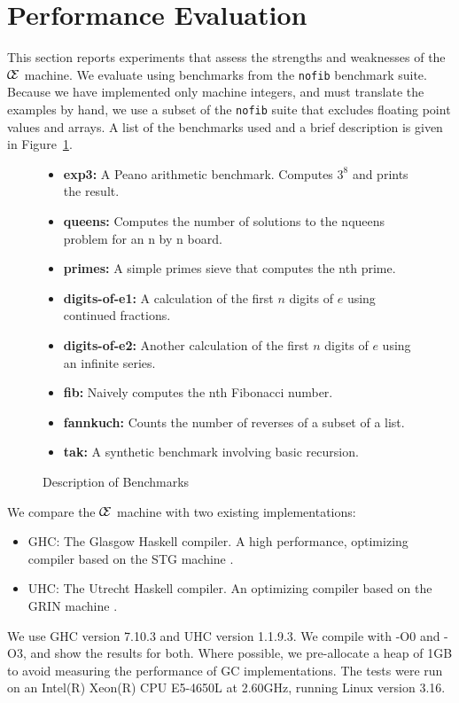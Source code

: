 \section{Performance Evaluation} \label{sec:eval}

This section reports experiments that assess the strengths and weaknesses of
the $\mathcal{\mathcal{C} \mskip -4mu \mathcal{E}}$ machine. We evaluate using benchmarks from the \texttt{nofib}
benchmark suite. Because we have implemented only machine integers, and must
translate the examples by hand, we use a subset of the \texttt{nofib} suite that
excludes floating point values and arrays. A list of the benchmarks used and a
brief description is given in Figure~\ref{fig:bench}.

\begin{figure}
\begin{itemize}
\item \textbf{exp3:} A Peano arithmetic benchmark. Computes $3^8$ and prints the result. 
\item \textbf{queens:} Computes the number of solutions to the nqueens problem
for an n by n board.
\item \textbf{primes:} A simple primes sieve that computes the nth prime.
\item \textbf{digits-of-e1:} A calculation of the first $n$ digits of $e$ using
continued fractions. 
\item \textbf{digits-of-e2:} Another calculation of the first $n$ digits of $e$ using an
infinite series.  
\item \textbf{fib:} Naively computes the nth Fibonacci number.
\item \textbf{fannkuch:} Counts the number of reverses of a subset of a list.
\item \textbf{tak:} A synthetic benchmark involving basic recursion.
\end{itemize}
\caption{Description of Benchmarks}
\label{fig:bench}
\end{figure}

We compare the $\mathcal{\mathcal{C} \mskip -4mu \mathcal{E}}$ machine with two existing implementations:

\begin{itemize}
\item GHC: The Glasgow Haskell compiler. A high performance, optimizing compiler
based on the STG machine \cite{jonesstg}.
\item UHC: The Utrecht Haskell compiler. An optimizing compiler based on the
GRIN machine \cite{boquist1997grin,dijkstra2009architecture}.
\end{itemize}

We use GHC version 7.10.3 and UHC version 1.1.9.3. We compile with -O0 and -O3,
and show the results for both. Where possible, we pre-allocate a heap of 1GB 
to avoid measuring the performance of GC implementations. The tests were run on
an Intel(R) Xeon(R) CPU E5-4650L at 2.60GHz, running Linux version 3.16. 
